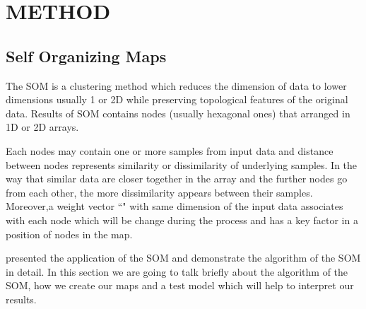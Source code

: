 
\section{METHOD}
\label{sec: method}
 \subsection{Self Organizing Maps}
 \label{sec: som}
 
 The SOM is a clustering method which reduces the dimension of data to lower dimensions usually 1 or 2D while preserving topological features of the original data.
 Results of SOM contains nodes (usually hexagonal ones) that arranged in 1D or 2D arrays.
 
 Each nodes may contain one or more samples from input data and distance between nodes represents similarity or dissimilarity of underlying samples. 
 In the way that similar data are closer together in the array and the further nodes go from each other, the more dissimilarity appears between their samples.
 Moreover,a weight vector ``" with same dimension of the input data associates with each node which will be change during the process and has a key factor in a position of nodes in the map. 
 
 \cite{Geach12} presented the application of the SOM and demonstrate the algorithm of the SOM in detail. In this section we are going to talk briefly about the algorithm of the SOM, how we create our maps and a test model which will help to interpret our results. 
